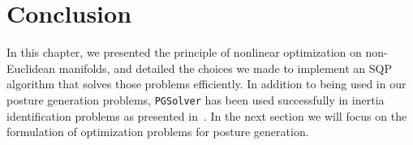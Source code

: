 \section{Conclusion}
\label{sec:conclusion}

In this chapter, we presented the principle of nonlinear optimization on non-Euclidean manifolds, and detailed the choices we made to implement an SQP algorithm that solves those problems efficiently.
In addition to being used in our posture generation problems, {\tt PGSolver} has been used successfully in inertia identification problems as presented in~\cite{traversaro:iros:2016}.
In the next section we will focus on the formulation of optimization problems for posture generation.


